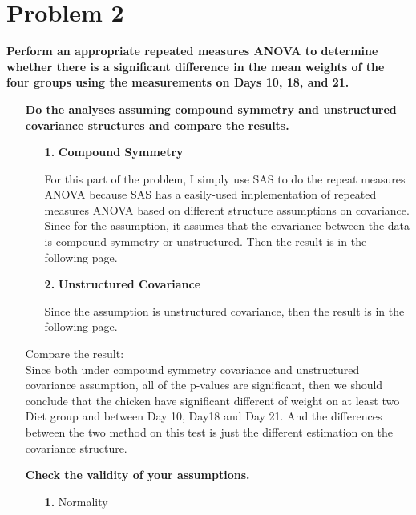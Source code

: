 \documentclass[10pt,letterpaper]{article}
\begin{document}
\section*{Problem 2}
\textbf{Perform an appropriate repeated measures ANOVA to determine whether there is a significant difference in the mean weights of the four groups using the measurements on Days 10, 18, and 21.}
\begin{enumerate}[leftmargin=0cm,itemindent=.5cm,labelwidth=\itemindent,labelsep=0cm,align=left]
\item[\textbullet] \textbf{Do the analyses assuming compound symmetry and unstructured covariance structures and compare the results.}
\begin{enumerate}[leftmargin=0cm,itemindent=.5cm,labelwidth=\itemindent,labelsep=0cm,align=left]
\item[\textbf{1.}] \textbf{Compound Symmetry}

For this part of the problem, I simply use SAS to do the repeat measures ANOVA because SAS has a easily-used implementation of repeated measures ANOVA based on different structure assumptions on covariance.
Since for the assumption, it assumes that the covariance between the data is compound symmetry or unstructured. Then the result is in the following page.
\item[\textbf{2.}] \textbf{Unstructured Covariance}

Since the assumption is unstructured covariance, then the result is in the following page.
\begin{center}


\end{center}
\end{enumerate}
Compare the result:\\
Since both under compound symmetry covariance and unstructured covariance assumption, all of the p-values are significant, then we should conclude that the chicken have significant different of weight on at least two Diet group and between Day 10, Day18 and Day 21. And the differences between the two method on this test is just the different estimation on the covariance structure.\\ 

\item[\textbullet] \textbf{Check the validity of your assumptions.}
\begin{enumerate}[leftmargin=0cm,itemindent=.5cm,labelwidth=\itemindent,labelsep=0cm,align=left]
\item[\textbf{1.}] Normality


\end{enumerate}
\end{enumerate}
\end{document}
